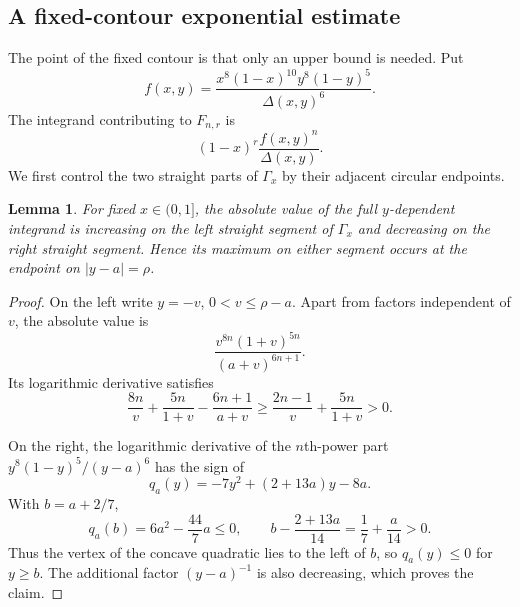\documentclass[11pt]{amsart}
\theoremstyle{plain}
\newtheorem{lemma}[theorem]{Lemma}
\theoremstyle{remark}\newtheorem{remark}[theorem]{Remark}
\numberwithin{equation}{section}
\begin{document}
\subsection{A fixed-contour exponential estimate}\label{q:sec:analytic}

The point of the fixed contour is that only an upper bound is needed.  Put
\begin{equation}\label{q:eq:fdef}
 f(x,y)=\frac{x^8(1-x)^{10}y^8(1-y)^5}{\Delta(x,y)^6}.
\end{equation}
The integrand contributing to $F_{n,r}$ is
\[
 (1-x)^r\frac{f(x,y)^n}{\Delta(x,y)}.
\]
We first control the two straight parts of $\Gamma_x$ by their adjacent
circular endpoints.

\begin{lemma}\label{q:lem:straight}
For fixed $x\in(0,1]$, the absolute value of the full $y$-dependent integrand
is increasing on the left straight segment of $\Gamma_x$ and decreasing on
the right straight segment.  Hence its maximum on either segment occurs at
the endpoint on $|y-a|=\rho$.
\end{lemma}

\begin{proof}
On the left write $y=-v$, $0<v\le\rho-a$.  Apart from factors independent of
$v$, the absolute value is
\[
 \frac{v^{8n}(1+v)^{5n}}{(a+v)^{6n+1}}.
\]
Its logarithmic derivative satisfies
\[
 \frac{8n}{v}+\frac{5n}{1+v}-\frac{6n+1}{a+v}
 \ge \frac{2n-1}{v}+\frac{5n}{1+v}>0.
\]

On the right, the logarithmic derivative of the $n$th-power part
$y^8(1-y)^5/(y-a)^6$ has the sign of
\[
 q_a(y)=-7y^2+(2+13a)y-8a.
\]
With $b=a+2/7$,
\[
 q_a(b)=6a^2-\frac{44}{7}a\le0,
 \qquad
 b-\frac{2+13a}{14}=\frac17+\frac a{14}>0.
\]
Thus the vertex of the concave quadratic lies to the left of $b$, so
$q_a(y)\le0$ for $y\ge b$.  The additional factor $(y-a)^{-1}$ is also
decreasing, which proves the claim.
\end{proof}
\end{document}
